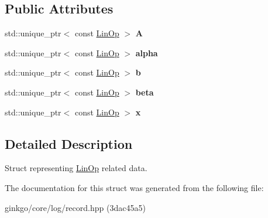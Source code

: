 \subsection*{Public Attributes}
\begin{DoxyCompactItemize}
\item 
\mbox{\label{structgko_1_1log_1_1linop__data_a02a1a3dacdf707cc5b6ee1173aad7aad}} 
std\+::unique\+\_\+ptr$<$ const \hyperlink{classgko_1_1LinOp}{Lin\+Op} $>$ {\bfseries A}
\item 
\mbox{\label{structgko_1_1log_1_1linop__data_ac65bf9ffa7f7d14a86b21d073d21471e}} 
std\+::unique\+\_\+ptr$<$ const \hyperlink{classgko_1_1LinOp}{Lin\+Op} $>$ {\bfseries alpha}
\item 
\mbox{\label{structgko_1_1log_1_1linop__data_aa03f552586f8de9e953057762d6e0b4b}} 
std\+::unique\+\_\+ptr$<$ const \hyperlink{classgko_1_1LinOp}{Lin\+Op} $>$ {\bfseries b}
\item 
\mbox{\label{structgko_1_1log_1_1linop__data_a5c0014fd2c39f067bbcc32e79b458b7b}} 
std\+::unique\+\_\+ptr$<$ const \hyperlink{classgko_1_1LinOp}{Lin\+Op} $>$ {\bfseries beta}
\item 
\mbox{\label{structgko_1_1log_1_1linop__data_a9c7297540351403305fc1633dad9fea6}} 
std\+::unique\+\_\+ptr$<$ const \hyperlink{classgko_1_1LinOp}{Lin\+Op} $>$ {\bfseries x}
\end{DoxyCompactItemize}


\subsection{Detailed Description}
Struct representing \hyperlink{classgko_1_1LinOp}{Lin\+Op} related data. 

The documentation for this struct was generated from the following file\+:\begin{DoxyCompactItemize}
\item 
ginkgo/core/log/record.\+hpp (3dac45a5)\end{DoxyCompactItemize}
